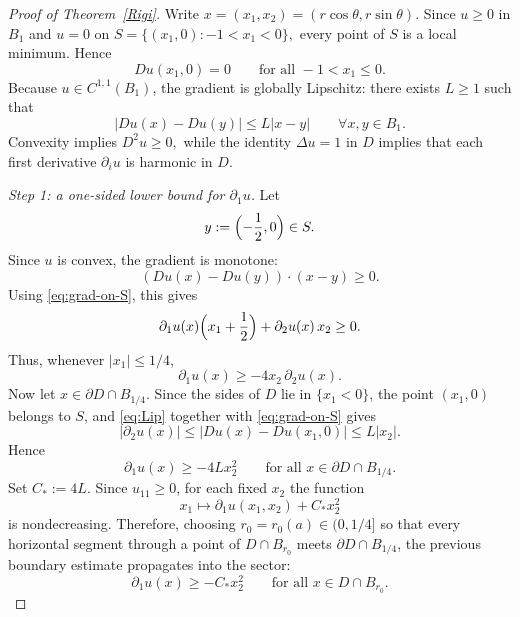 \documentclass[10pt,a4paper]{amsart}
\begin{document}
\begin{proof}[Proof of Theorem~\ref{Rigi}]
Write
$x=(x_1,x_2)=(r\cos\theta,r\sin\theta).$
Since $u\ge0$ in $B_1$ and $u=0$ on
$S=\{(x_1,0): -1<x_1<0\},$
every point of $S$ is a local minimum. Hence
\begin{equation}\label{eq:grad-on-S}
D u(x_1,0)=0
\qquad\text{for all }-1<x_1\le0.
\end{equation}
Because $u\in C^{1,1}(B_1)$, the gradient is globally Lipschitz: there exists $L\ge1$ such that
\begin{equation}\label{eq:Lip}
|D u(x)-D u(y)|\le L|x-y|
\qquad\forall x,y\in B_1.
\end{equation}
Convexity implies $D^2u\ge0,$
while the identity $\Delta u=1$ in $D$ implies that each first derivative $\partial_i u$
is harmonic in $D$.

\medskip
\noindent\textit{Step 1: a one-sided lower bound for $\partial_1u$.}
Let
\[
y:=\Bigl(-\frac12,0\Bigr)\in S.
\]
Since $u$ is convex, the gradient is monotone:
\[
(D u(x)-D u(y))\cdot (x-y)\ge0.
\]
Using \eqref{eq:grad-on-S}, this gives
\[
\partial_1u(x)\Bigl(x_1+\frac12\Bigr)+\partial_2u(x)\,x_2\ge0.
\]
Thus, whenever $|x_1|\le1/4$,
\[
\partial_1u(x)\ge -4x_2\,\partial_2u(x).
\]
Now let $x\in \partial D\cap B_{1/4}$. Since the sides of $D$ lie in $\{x_1<0\}$, the point
$(x_1,0)$ belongs to $S$, and \eqref{eq:Lip} together with \eqref{eq:grad-on-S} gives
\[
|\partial_2u(x)|
\le |D u(x)-D u(x_1,0)|
\le L|x_2|.
\]
Hence
\[
\partial_1u(x)\ge -4Lx_2^2
\qquad\text{for all }x\in \partial D\cap B_{1/4}.
\]
Set
$C_\ast:=4L.$
Since $u_{11}\ge0$, for each fixed $x_2$ the function
\[
x_1\longmapsto \partial_1u(x_1,x_2)+C_\ast x_2^2
\]
is nondecreasing. Therefore, choosing $r_0=r_0(a)\in(0,1/4]$ so that every horizontal segment
through a point of $D\cap B_{r_0}$ meets $\partial D\cap B_{1/4}$, the previous boundary estimate
propagates into the sector:
\begin{equation}\label{eq:basic-lower}
\partial_1u(x)\ge -C_\ast x_2^2
\qquad\text{for all }x\in D\cap B_{r_0}.
\end{equation}


\end{proof}
\end{document}
